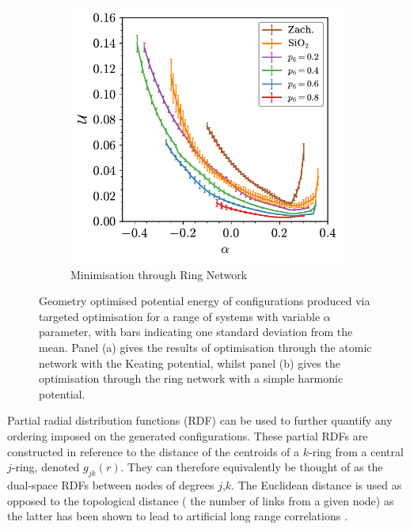 \begin{figure}[bt]
\begin{subfigure}[b]{0.45\textwidth}
         \includegraphics[width=\textwidth]{./figures/targeted_opt/topt_u_dual.pdf}
         \caption{Minimisation through Ring Network}
         \label{fig:toptenergy2}
     \end{subfigure}

     \caption{Geometry optimised potential energy of configurations produced via targeted optimisation for a range of systems with variable $\alpha$ parameter, with bars indicating one standard deviation from the mean. Panel (a) gives the results of optimisation through the atomic network with the Keating potential, whilst panel (b) gives the optimisation through the ring network with a simple harmonic potential.}
     \label{fig:toptenergy}
\end{figure}

Partial radial distribution functions (RDF)  can be used to further quantify any ordering imposed on the generated configurations.
These partial RDFs are constructed in reference to the distance of the centroids of a $k$\--ring from a central $j$\--ring, denoted $g_{jk}\left(r\right)$.
They can therefore equivalently be thought of as the dual\--space RDFs between nodes of degrees $j$,$k$.
The Euclidean distance is used as opposed to the topological distance (\ie{} the number of links from a given node) as the latter has been shown to lead to artificial long range correlations \cite{Sadjadi2016}. 

